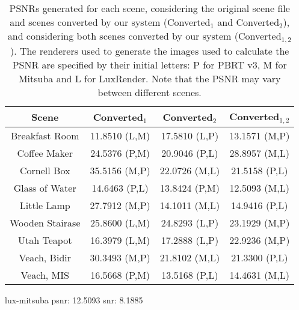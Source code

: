 \scriptsize
\begin{table}
\begin{center}
    \begin{tabular}{ | c | c | c | c | }
    \hline
    {\bf Scene} & {\bf Converted$_1$} & {\bf Converted$_2$} & {\bf Converted$_{1,2}$} \\ 
    \hline
    Breakfast Room & 11.8510 \small{(L,M)} & 17.5810 \small{(L,P)} & 13.1571 \small{(M,P)} \\
    Coffee Maker & 24.5376 \small{(P,M)} & 20.9046 \small{(P,L)} & 28.8957 \small{(M,L)} \\
    Cornell Box & 35.5156 \small{(M,P)} & 22.0726 \small{(M,L)} & 21.5158 \small{(P,L)} \\
  	Glass of Water & 14.6463 \small{(P,L)} & 13.8424 \small{(P,M)} & 12.5093 \small{(M,L)} \\
  	Little Lamp & 27.7912 \small{(M,P)} & 14.1011 \small{(M,L)} & 14.9416 \small{(P,L)} \\
  	Wooden Stairase & 25.8600 \small{(L,M)} & 24.8293 \small{(L,P)} & 23.1929 \small{(M,P)} \\
  	Utah Teapot & 16.3979 \small{(L,M)} & 17.2888 \small{(L,P)} & 22.9236 \small{(M,P)} \\
	Veach, Bidir & 30.3493 \small{(M,P)} & 21.8102 \small{(M,L)} & 21.3300 \small{(P,L)} \\
	Veach, MIS & 16.5668 \small{(P,M)} & 13.5168 \small{(P,L)} & 14.4631 \small{(M,L)} \\
	\hline

    \end{tabular}
\end{center}
  \caption{PSNRs generated for each scene, considering the original scene file and scenes converted by our system (Converted$_1$ and Converted$_2$), and considering both scenes converted by our system (Converted$_{1,2}$). The renderers used to generate the images used to calculate the PSNR are specified by their initial letters: P for PBRT v3, M for Mitsuba and L for LuxRender. Note that the PSNR may vary between different scenes. } 
  \label{tab:summary}
\end{table}
\normalsize 


lux-mitsuba
psnr: 12.5093
snr: 8.1885
